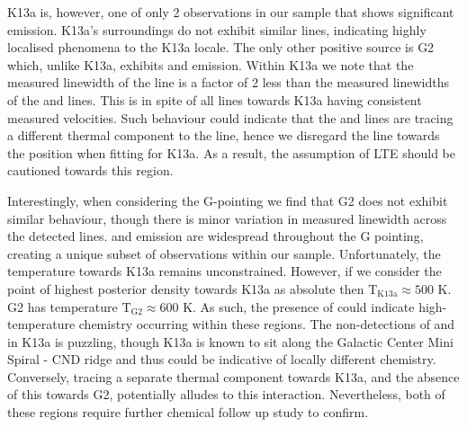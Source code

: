 \documentclass[twocolumn]{aastex631}
\begin{document}
K13a is, however, one of only 2 observations in our sample that shows significant  emission. K13a's surroundings do not exhibit similar  lines, indicating highly localised phenomena to the K13a locale. The only other  positive source is G2 which, unlike K13a, exhibits  and  emission. Within K13a we note that the measured linewidth of the  line is a factor of 2 less than the measured linewidths of the  and  lines. This is in spite of all lines towards K13a having consistent measured velocities. Such behaviour could indicate that the  and  lines are tracing a different thermal component to the  line, hence we disregard the  line towards the position when fitting for K13a. As a result, the assumption of LTE should be cautioned towards this region. 

Interestingly, when considering the G-pointing we find that G2 does not exhibit similar behaviour, though there is minor variation in measured linewidth across the detected lines.  and  emission are widespread throughout the G pointing, creating a unique subset of observations within our sample. Unfortunately, the temperature towards K13a remains unconstrained. However, if we consider the point of highest posterior density towards K13a as absolute then $\mathrm{T_{K13a}} \approx 500$ \si{\kelvin}. G2 has temperature $\mathrm{T_{G2}} \approx 600$ \si{\kelvin}. As such, the presence of  could indicate high-temperature chemistry occurring within these regions. The non-detections of  and  in K13a is puzzling, though K13a is known to sit along the Galactic Center Mini Spiral - CND ridge and thus could be indicative of locally different chemistry. Conversely,  tracing a separate thermal component towards K13a, and the absence of this towards G2, potentially alludes to this interaction. Nevertheless, both of these regions require further chemical follow up study to confirm. 
\end{document}
